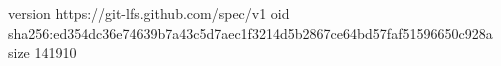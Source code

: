 version https://git-lfs.github.com/spec/v1
oid sha256:ed354dc36e74639b7a43c5d7aec1f3214d5b2867ce64bd57faf51596650c928a
size 141910
